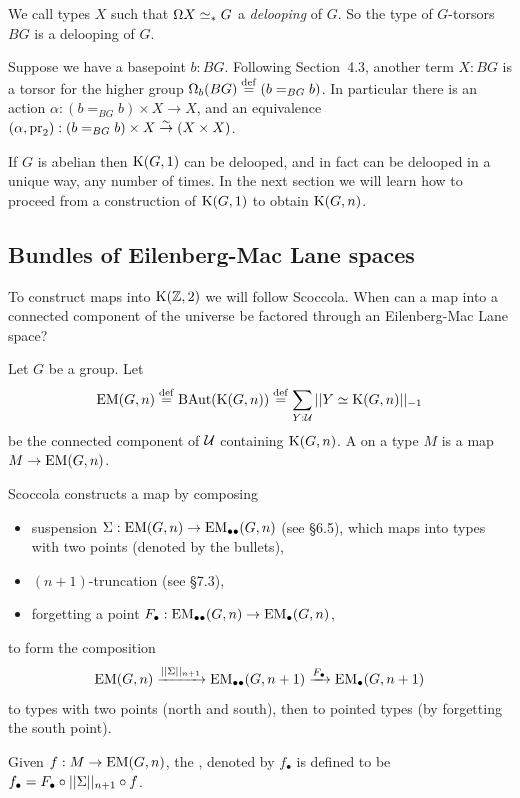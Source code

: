 We call types \( X \) such that \( \Omega X\simeq_* G \) a \emph{delooping} of \( G \). So the type of \( G \)-torsors \( BG \) is a delooping of \( G \).

Suppose we have a basepoint \( b:BG \). Following \cite{buchholtz2023central} Section~4.3, another term \( X:BG \) is a torsor for the higher group \( \Omega_b(BG)\stackrel{\mathrm{def}}{=} (b=_{BG} b) \). In particular there is an action \( \alpha:(b=_{BG}b)\times X\to X \), and an equivalence \( (\alpha, \mathrm{pr}_2) : (b=_{BG}b)\times X\stackrel{\sim}{\to} (X\times X)\).

If \( G \) is abelian then \( \mathrm{K}(G,1) \) can be delooped, and in fact can be delooped in a unique way, any number of times. In the next section we will learn how to proceed from a construction of \( \mathrm{K}(G, 1) \) to obtain \( \mathrm{K}(G, n) \).

\subsection{Bundles of Eilenberg-Mac Lane spaces}

To construct maps into \( \mathrm{K}(\mathbb{Z},2) \) we will follow Scoccola\cite{sco}. When can a map into a connected component of the universe be factored through an Eilenberg-Mac Lane space?

\begin{mydef}
Let \( G \) be a group. Let \[ \mathrm{EM}(G,n)\stackrel{\mathrm{def}}{=} \operatorname{BAut}(\mathrm{K}(G,n))\stackrel{\mathrm{def}}{=} \sum_{Y:\mathcal{U}}||Y\simeq \mathrm{K}(G,n)||_{-1}\] be the connected component of \( \mathcal{U} \) containing \( \mathrm{K}(G,n) \). A  on a type \( M \) is a map \( M\to\mathrm{EM}(G,n) \).
\end{mydef}

Scoccola constructs a map by composing 
\begin{itemize}
\item suspension \( \Sigma:\mathrm{EM}(G,n)\to\mathrm{EM}_{\bullet\bullet}(G,n) \) (see \cite{hottbook} §6.5), which maps into types with two points (denoted by the bullets),
\item \( (n+1) \)-truncation (see \cite{hottbook} §7.3),
\item forgetting a point \( F_\bullet:\mathrm{EM}_{\bullet\bullet}(G,n)\to \mathrm{EM}_{\bullet}(G,n) \),
\end{itemize}
to form the composition
\[ 
\mathrm{EM}(G,n)\xrightarrow[]{||\Sigma||_{n+1}} \mathrm{EM}_{\bullet\bullet}(G,n+1)\xrightarrow[]{F_\bullet}\mathrm{EM_{\bullet}}(G,n+1)
\]
to types with two points (north and south), then to pointed types (by forgetting the south point).

\begin{mydef}
Given \( f:M\to\mathrm{EM}(G,n) \), the , denoted by \( f_\bullet \) is defined to be \( f_\bullet=F_\bullet\circ||\Sigma||_{n+1}\circ f \).
\end{mydef}

